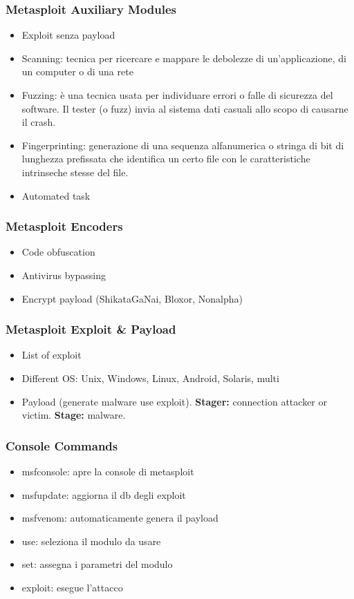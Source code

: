 \documentclass[8pt]{extarticle}
\begin{document}
\subsubsection{Metasploit Auxiliary Modules}
\begin{itemize}
    \item Exploit senza payload
    \item Scanning: tecnica per ricercare e mappare le debolezze di un'applicazione, di un computer o 
    di una rete
    \item Fuzzing: è una tecnica usata per individuare errori o falle di sicurezza del software. Il tester
     (o fuzz) invia al sistema dati casuali allo scopo di causarne il crash.
     \item Fingerprinting: generazione di una sequenza alfanumerica o stringa di bit di lunghezza prefissata 
     che identifica un certo file con le caratteristiche intrinseche stesse del file.
     \item Automated task
\end{itemize}
\subsubsection{Metasploit Encoders}
\begin{itemize}
    \item Code obfuscation
    \item Antivirus bypassing
    \item Encrypt payload (ShikataGaNai, Bloxor, Nonalpha)
\end{itemize}
\subsubsection{Metasploit Exploit \& Payload}
\begin{itemize}
    \item List of exploit
    \item Different OS: Unix, Windows, Linux, Android, Solaris, multi
    \item Payload (generate malware use exploit). \textbf{Stager:} connection attacker or victim. 
     \textbf{Stage:} malware.
\end{itemize}
\subsubsection{Console Commands}
\begin{itemize}
    \item msfconsole: apre la console di metasploit
    \item msfupdate: aggiorna il db degli exploit
    \item msfvenom: automaticamente genera il payload
    \item use: seleziona il modulo da usare
    \item set: assegna i parametri del modulo
    \item exploit: esegue l’attacco
\end{itemize}
\end{document}
